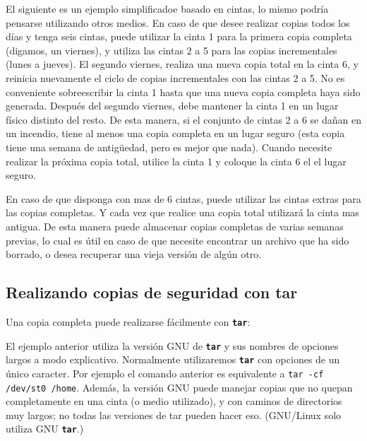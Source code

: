 \documentclass[12pt]{article}
\begin{document}
El siguiente es un ejemplo simplificadoe basado en cintas, lo mismo podría 
pensarse utilizando otros medios. 
En caso de que desee realizar copias todos los días y tenga seis cintas, 
puede utilizar la cinta 1 para la primera copia completa (digamos, un 
viernes), y utiliza las cintas 2 a 5 para las copias incrementales 
(lunes a jueves). El segundo viernes, realiza una nueva copia total en la 
cinta 6, y reinicia nuevamente el ciclo de copias incrementales con las 
cintas 2 a 5. No es conveniente sobreescribir la cinta 1 hasta que una 
nueva copia completa haya sido generada. Después del segundo viernes, debe
mantener la cinta 1 en un lugar físico distinto del resto. De esta manera, 
si el conjunto de cintas 2 a 6 se dañan en un incendio, tiene al menos una 
copia completa en un lugar seguro (esta copia tiene una semana de 
antigüedad, pero es mejor que nada).  Cuando necesite realizar la próxima 
copia total, utilice la cinta 1 y coloque la cinta 6 el el lugar seguro.

En caso de que disponga con mas de 6 cintas, puede utilizar las cintas 
extras para las copias completas. Y cada vez que realice una copia total 
utilizará la cinta mas antigua. De esta manera puede almacenar copias
completas de varias semanas previas, lo cual es útil en caso de que necesite
encontrar un archivo que ha sido borrado, o desea recuperar una vieja 
versión de algún otro.

\subsection*{Realizando copias de seguridad con tar}

Una copia completa puede realizarse fácilmente con \texttt{\textbf{tar}}:


El ejemplo anterior utiliza la versión GNU de \texttt{\textbf{tar}} y sus 
nombres de opciones largos a modo explicativo. Normalmente utilizaremos 
\texttt{\textbf{tar}} con opciones de un único caracter. Por ejemplo el 
comando anterior es equivalente a {\tt tar -cf /dev/st0 /home}. 
Además, la versión GNU puede manejar copias que no quepan completamente 
en una cinta (o medio utilizado), y con caminos de
directorios muy largos; no todas las versiones de tar pueden hacer eso. 
(GNU/Linux solo utiliza GNU \texttt{\textbf{tar}}.)  
\end{document}
